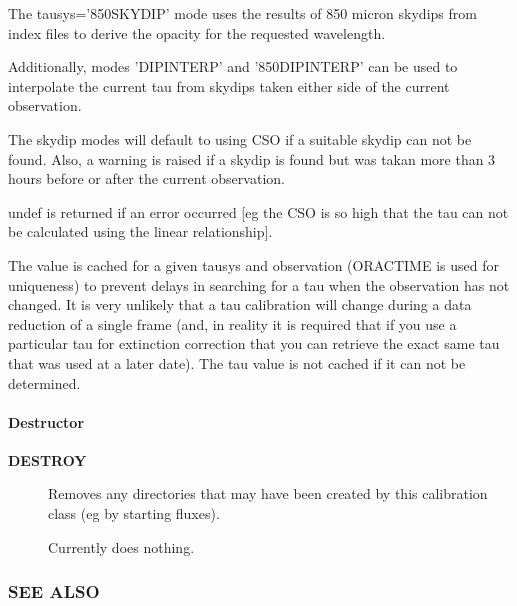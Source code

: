\begin{description}
The tausys='850SKYDIP' mode uses the results of 850 micron skydips
from index files to derive the opacity for the requested wavelength.



Additionally, modes 'DIPINTERP' and '850DIPINTERP' can be used to
interpolate the current tau from skydips taken either side of the
current observation.



The skydip modes will default to using CSO if a suitable
skydip can not be found. Also, a warning is raised if a skydip
is found but was takan more than 3 hours before or after the
current observation.



undef is returned if an error occurred [eg the CSO is so high that the
tau can not be calculated using the linear relationship].



The value is cached for a given tausys and observation (ORACTIME is
used for uniqueness) to prevent delays in searching for a tau when the
observation has not changed. It is very unlikely that a tau calibration
will change during a data reduction of a single frame (and, in reality
it is required that if you use a particular tau for extinction correction
that you can retrieve the exact same tau that was used at a later date).
The tau value is not cached if it can not be determined.

\end{description}
\paragraph*{Destructor\label{ORAC::Calib::SCUBA_Destructor}}
\begin{description}

\item[\textbf{DESTROY}] \mbox{}

Removes any directories that may have been created by this
calibration class (eg by starting fluxes).



Currently does nothing.

\end{description}
\subsubsection*{SEE ALSO\label{ORAC::Calib::SCUBA_SEE_ALSO}}


